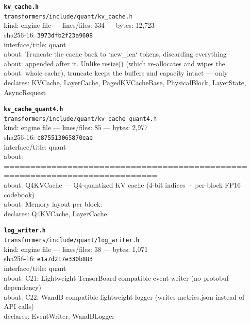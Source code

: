 \noindent\textbf{\texttt{kv\_cache.h}}\\
\texttt{transformers/include/quant/kv\_cache.h}\\
kind: engine file --- lines/files: 334 --- bytes: 12,723\\
sha256-16: \texttt{3973dfb2f23a9608}\\
interface/title: quant\\
about: Truncate the cache back to `new\_len` tokens, discarding everything\\
about: appended after it. Unlike resize() (which re-allocates and wipes the\\
about: whole cache), truncate keeps the buffers and capacity intact — only\\
declares: KVCache, LayerCache, PagedKVCacheBase, PhysicalBlock, LayerState, AsyncRequest\\
\vspace*{6.0pt}

\noindent\textbf{\texttt{kv\_cache\_quant4.h}}\\
\texttt{transformers/include/quant/kv\_cache\_quant4.h}\\
kind: engine file --- lines/files: 85 --- bytes: 2,977\\
sha256-16: \texttt{c875513065870eae}\\
interface/title: quant\\
about: ===========================================================================\\
about: Q4KVCache — Q4-quantized KV cache (4-bit indices + per-block FP16 codebook)\\
about: Memory layout per block:\\
declares: Q4KVCache, LayerCache\\
\vspace*{6.0pt}

\noindent\textbf{\texttt{log\_writer.h}}\\
\texttt{transformers/include/quant/log\_writer.h}\\
kind: engine file --- lines/files: 38 --- bytes: 1,071\\
sha256-16: \texttt{e1a7d217e330b883}\\
interface/title: quant\\
about: C21: Lightweight TensorBoard-compatible event writer (no protobuf dependency)\\
about: C22: WandB-compatible lightweight logger (writes metrics.json instead of API calls)\\
declares: EventWriter, WandBLogger\\
\vspace*{6.0pt}
\newpage

